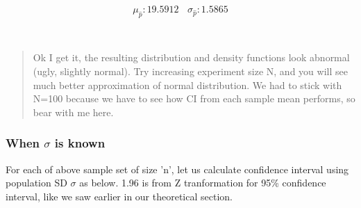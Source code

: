 \documentclass[float=false,crop=false]{standalone}
\begin{document}
\begin{InVerbatim}[commandchars=\\\{\},fontsize=\scriptsize]
             
          
\end{InVerbatim}
    $$\mu_{\hat{p}}:19.5912 \ \ \ \ \sigma_{\hat{p}}:1.5865$$

    
    \begin{center}
    \end{center}
    { \hspace*{\fill} \\}
    
    \begin{quote}
Ok I get it, the resulting distribution and density functions look
abnormal (ugly, slightly normal). Try increasing experiment size N, and
you will see much better approximation of normal distribution. We had to
stick with N=100 because we have to see how CI from each sample mean
performs, so bear with me here.
\end{quote}

    \subsubsection{\texorpdfstring{When \(\sigma\) is
known}{When \textbackslash{}sigma is known}}\label{when-sigma-is-known}

For each of above sample set of size 'n', let us calculate confidence
interval using population SD \(\sigma\) as below. 1.96 is from Z
tranformation for 95\% confidence interval, like we saw earlier in our
theoretical section.
\end{document}
